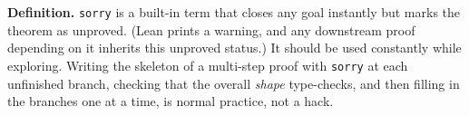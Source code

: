 \textbf{Definition.} \texttt{sorry} is a built-in term that closes any goal instantly but marks the theorem as unproved. (Lean prints a warning, and any downstream proof depending on it inherits this unproved status.) It should be used constantly while exploring. Writing the skeleton of a multi-step proof with \texttt{sorry} at each unfinished branch, checking that the overall \emph{shape} type-checks, and then filling in the branches one at a time, is normal practice, not a hack.
